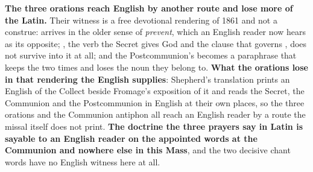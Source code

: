 \textbf{The three orations reach English by another route and lose more of the
Latin.} Their witness is a free devotional rendering of 1861 and not a construe:
 arrives in the older sense of \emph{prevent}, which an English
reader now hears as its opposite; , the verb
the Secret gives God and the clause that governs , does not
survive into it at all; and the Postcommunion's  becomes a paraphrase that keeps the two
times and loses the noun they belong to. \textbf{What the orations lose in that
rendering the English  supplies}: Shepherd's translation
prints an English of the Collect beside Fromage's exposition of it and reads the
Secret, the Communion and the
Postcommunion in English at their own places, so the three orations and the
Communion antiphon all reach an English reader by a route the missal itself does
not print. \textbf{The
doctrine the three prayers say in Latin is sayable to an English reader on the
appointed words at the Communion and nowhere else in this Mass}, and the two
decisive chant words have no English witness here at all.

\clearpage
